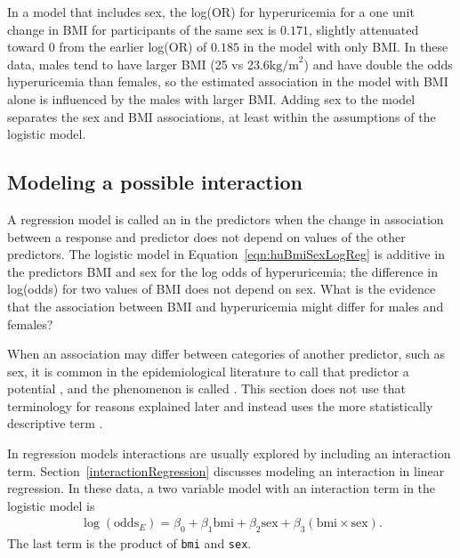 In a model that includes sex, the log(OR) for hyperuricemia for a one unit change in BMI for participants of the same sex is $0.171$, slightly attenuated toward 0 from the earlier log(OR) of $0.185$ in the model with only BMI. In these data, males tend to have larger BMI (25 vs 23.6$\text{kg/m}^2$) and have double the odds hyperuricemia than females, so the estimated association in the model with BMI alone is influenced by the males with larger BMI.  Adding sex to the model separates the sex and BMI associations, at least within the assumptions of the logistic model.



\subsection{Modeling a possible interaction}
\label{section:interactionLogisticRegression}


A regression model is called an  in the predictors when the change in association between a response and predictor does not depend on values of the other predictors. The logistic model in Equation~\ref{eqn:huBmiSexLogReg} is additive in the predictors BMI and sex for the log odds of hyperuricemia; the difference in log(odds) for two values of BMI does not depend on sex. What is the evidence that the association between BMI and hyperuricemia might differ for males and females?

When an association may differ between categories of another predictor, such as sex, it is common in the epidemiological literature to call that predictor a potential , and the phenomenon is called .  This section does not use that terminology for reasons explained later and instead uses the more statistically descriptive term .

In regression models interactions are usually explored by including an interaction term.  Section~\ref{interactionRegression} discusses modeling an interaction in linear regression.  In these data, a two variable model with an interaction term in the logistic model is
\begin{align}
  \log(\text{odds}_E) = \beta_0 + \beta_1 \text{bmi}
       + \beta_2 \text{sex} + \beta_3 (\text{bmi}\times\text{sex}).
       \label{eqn:huBmiSexInteraction}
\end{align}
The last term is the product of \texttt{bmi} and \texttt{sex}.


